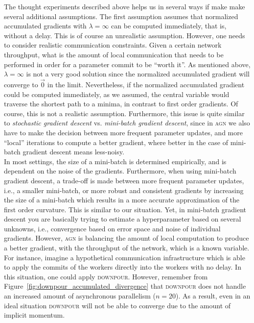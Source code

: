 The thought experiments described above helps us in several ways if make make several additional assumptions. The first assumption assumes that normalized accumulated gradients with $\lambda = \infty$ can be computed immediately, that is, without a delay. This is of course an unrealistic assumption. However, one needs to consider realistic communication constraints. Given a certain network throughput, what is the amount of local communication that needs to be performed in order for a parameter commit to be ``worth it''. As mentioned above, $\lambda = \infty$ is not a very good solution since the normalized accumulated gradient will converge to $\vec{0}$ in the limit. Nevertheless, if the normalized accumulated gradient could be computed immediately, as we assumed, the central variable would traverse the shortest path to a minima, in contrast to first order gradients. Of course, this is not a realistic assumption. Furthermore, this issue is quite similar to \emph{stochastic gradient descent} vs. \emph{mini-batch gradient descent}, since in \textsc{agn} we also have to make the decision between more frequent parameter updates, and more ``local'' iterations to compute a better gradient, where better in the case of mini-batch gradient descent means less-noisy.\\

In most settings, the size of a mini-batch is determined empirically, and is dependent on the noise of the gradients. Furthermore, when using mini-batch gradient descent, a trade-off is made between more frequent parameter updates, i.e., a smaller mini-batch, or more robust and consistent gradients by increasing the size of a mini-batch which results in a more accurate approximation of the first order curvature. This is similar to our situation. Yet, in mini-batch gradient descent you are basically trying to estimate a hyperparameter based on several unknowns, i.e., convergence based on error space and noise of individual gradients. However, \textsc{agn} is balancing the amount of local computation to produce a better gradient, with the throughput of the network, which is a known variable. For instance, imagine a hypothetical communication infrastructure which is able to apply the commits of the workers directly into the workers with no delay. In this situation, one could apply \textsc{downpour}. However, remember from Figure~\ref{fig:downpour_accumulated_divergence} that \textsc{downpour} does not handle an increased amount of asynchronous parallelism ($n = 20$). As a result, even in an ideal situation \textsc{downpour} will not be able to converge due to the amount of implicit momentum.\\

